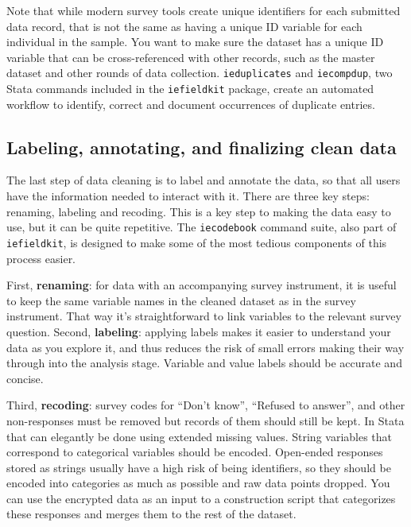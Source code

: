 Note that while modern survey tools create unique identifiers for each submitted data record,
that is not the same as having a unique ID variable for each individual in the sample.
You want to make sure the dataset has a unique ID variable
that can be cross-referenced with other records, such as the master dataset
and other rounds of data collection.
\texttt{ieduplicates} and \texttt{iecompdup},
two Stata commands included in the \texttt{iefieldkit}
package,
create an automated workflow to identify, correct and document
occurrences of duplicate entries.

\subsection{Labeling, annotating, and finalizing clean data}

The last step of data cleaning is to label and annotate the data,
so that all users have the information needed to interact with it.
There are three key steps: renaming, labeling and recoding.
This is a key step to making the data easy to use, but it can be quite repetitive.
The \texttt{iecodebook} command suite, also part of \texttt{iefieldkit},
is designed to make some of the most tedious components of this process easier.

First, \textbf{renaming}: for data with an accompanying survey instrument,
it is useful to keep the same variable names in the cleaned dataset as in the survey instrument.
That way it's straightforward to link variables to the relevant survey question.
Second, \textbf{labeling}: applying labels makes it easier to understand your data as you explore it,
and thus reduces the risk of small errors making their way through into the analysis stage.
Variable and value labels should be accurate and concise.

Third, \textbf{recoding}: survey codes for ``Don't know'', ``Refused to answer'', and
other non-responses must be removed but records of them should still be kept. In Stata that can elegantly be done using extended missing values.
String variables that correspond to categorical variables should be encoded.
Open-ended responses stored as strings usually have a high risk of being identifiers,
so they should be encoded into categories as much as possible and raw data points dropped.
You can use the encrypted data as an input to a construction script
that categorizes these responses and merges them to the rest of the dataset.

